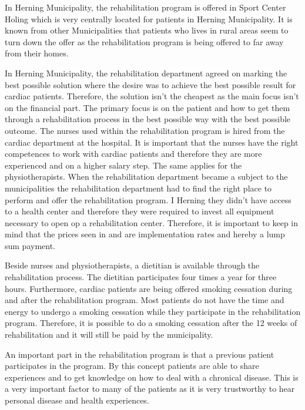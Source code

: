 In Herning Municipality, the rehabilitation program is offered in Sport Center Holing which is very centrally located for patients in Herning Municipality. It is known from other Municipalities that patients who lives in rural areas seem to turn down the offer as the rehabilitation program is being offered to far away from their homes. 

In Herning Municipality, the rehabilitation department agreed on marking the best possible solution where the desire was to achieve the best possible result for cardiac patients. Therefore, the solution isn’t the cheapest as the main focus isn’t on the financial part. The primary focus is on the patient and how to get them through a rehabilitation process in the best possible way with the best possible outcome. The nurses used within the rehabilitation program is hired from the cardiac department at the hospital. It is important that the nurses have the right competences to work with cardiac patients and therefore they are more experienced and on a higher salary step. The same applies for the physiotherapists. When the rehabilitation department became a subject to the municipalities the rehabilitation department had to find the right place to perform and offer the rehabilitation program. I Herning they didn’t have access to a health center and therefore they were required to invest all equipment necessary to open op a rehabilitation center. Therefore, it is important to keep in mind that the prices seen in  and  are implementation rates and hereby a lump sum payment.   

Beside nurses and physiotherapists, a dietitian is available through the rehabilitation process. The dietitian participates four times a year for three hours. Furthermore, cardiac patients are being offered smoking cessation during and after the rehabilitation program. Most patients do not have the time and energy to undergo a smoking cessation while they participate in the rehabilitation program. Therefore, it is possible to do a smoking cessation after the 12 weeks of rehabilitation and it will still be paid by the municipality.   

An important part in the rehabilitation program is that a previous patient participates in the program. By this concept patients are able to share experiences and to get knowledge on how to deal with a chronical disease. This is a very important factor to many of the patients as it is very trustworthy to hear personal disease and health experiences. 


